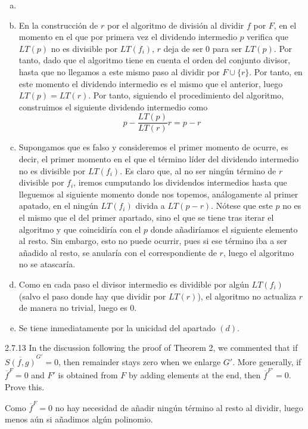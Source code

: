 \documentclass[twoside]{article}
\begin{document}
\begin{solucion}
\begin{enumerate}[a.]
\item[]
\item En la construcción de $r$ por el algoritmo de división al dividir $f$ por $F$, en el momento en el que por primera vez el dividendo intermedio $p$ verifica que $LT(p)$ no es divisible por $LT(f_i)$, $r$ deja de ser $0$ para ser $LT(p)$.  Por tanto, dado que el algoritmo tiene en cuenta el orden del conjunto divisor, hasta que no llegamos a este mismo paso al dividir por $F\cup\{r\}$. Por tanto, en este momento el dividendo intermedio es el mismo que el anterior, luego $LT(p)=LT(r)$. Por tanto, siguiendo el procedimiento del algoritmo, construimos el siguiente dividendo intermedio como 
$$
p-\frac{LT(p)}{LT(r)}r=p-r
$$
\item Supongamos que es falso y consideremos el primer momento de ocurre, es decir, el primer momento en el que el término líder del dividendo intermedio no es divisible por $LT(f_i)$. Es claro que, al no ser ningún término de $r$ divisible por $f_i$, iremos cumputando los dividendos intermedios hasta que lleguemos al siguiente momento donde nos topemos, análogamente al primer apatado, en el ningún $LT(f_i)$ divida a $LT(p-r)$. Nótese que este $p$ no es el mismo que el del primer apartado, sino el que se tiene tras iterar el algoritmo y que coincidiría con el $p$ donde añadiríamos el siguiente elemento al resto. Sin embargo, esto no puede ocurrir, pues si ese término iba a ser añadido al resto, se anularía con el correspondiente de $r$, luego el algoritmo no se atascaría.
\item Como en cada paso el divisor intermedio es dividible por algún $LT(f_i)$ (salvo el paso donde hay que dividir por $LT(r)$), el algoritmo no actualiza $r$ de manera no trivial, luego es $0$.
\item Se tiene inmediatamente por la unicidad del apartado $(d)$.
\end{enumerate}
\end{solucion}

\newpage

\begin{ejercicio}{2.7.13}
In the discussion following the proof of Theorem 2, we commented that if $\overline{S( f , g)}^{G'} = 0$,
then remainder stays zero when we enlarge $G'$. More generally, if $\overline{f}^F = 0$ and $F'$ is
obtained from $F$ by adding elements at the end, then $\overline{f}^{F'} = 0$. Prove this.
\end{ejercicio}
\begin{solucion}
Como $\overline{f}^F = 0$ no hay necesidad de añadir ningún término al resto al dividir, luego menos aún si añadimos algún polinomio.
\end{solucion}
\end{document}
